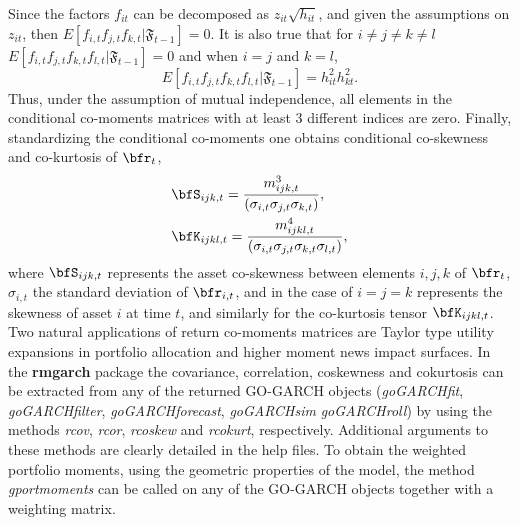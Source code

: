 Since the factors $f_{it}$ can be decomposed as $z_{it}\sqrt{h_{it}}$, and given
the assumptions on \( z_{it} \), then \(E[f_{i,t}f_{j,t}f_{k,t}|\mathfrak{F}_{t-1}] = 0\).
It is also true that for \( i \neq j\neq k \neq l \)\(E[f_{i,t}f_{j,t}f_{k,t}f_{l,t}|\mathfrak{F}_{t-1}] = 0\)
and when \(i=j\) and \(k=l\),
\begin{equation*}
E[f_{i,t}f_{j,t}f_{k,t}f_{l,t}|\mathfrak{F}_{t-1}]  =  h_{it}^2 h_{kt}^2.
\end{equation*}
Thus, under the assumption of mutual independence, all elements in the conditional
co-moments matrices with at least 3 different indices are zero. Finally, standardizing
the conditional co-moments one obtains conditional co-skewness and co-kurtosis of $\bfr_t$,
\begin{equation}\label{eq:facd7}
\begin{gathered}
  \bfS_{ijk,t} = \frac{m_{ijk,t}^3}{({\sigma_{i,t}}{\sigma _{j,t}}{\sigma _{k,t}})}, \hfill \\
  \bfK_{ijkl,t} = \frac{m_{ijkl,t}^4}{({\sigma_{i,t}}{\sigma _{j,t}}{\sigma _{k,t}}{\sigma _{l,t}})}, \hfill \\
\end{gathered}
\end{equation}
where $ \bfS_{ijk,t}$ represents the asset co-skewness between elements
$i,j,k$ of $\bfr_t$, $\sigma_{i,t}$ the standard deviation  of $\bfr_{i,t}$, and
in the case of $i=j=k$ represents the skewness of asset \(i\) at time $t$, and
similarly for the co-kurtosis tensor $\bfK_{ijkl,t}$. Two natural applications
of return co-moments matrices are Taylor type utility expansions in portfolio
allocation and higher moment news impact surfaces. In the {\bf rmgarch} package
the covariance, correlation, coskewness and cokurtosis can be extracted from any
of the returned GO-GARCH objects (\emph{goGARCHfit}, \emph{goGARCHfilter},
\emph{goGARCHforecast}, \emph{goGARCHsim} \emph{goGARCHroll}) by using the methods
\emph{rcov}, \emph{rcor}, \emph{rcoskew} and \emph{rcokurt}, respectively.
Additional arguments to these methods are clearly detailed in the help files.
To obtain the weighted portfolio moments, using the geometric properties of the
model, the method \emph{gportmoments} can be called on any of the GO-GARCH
objects together with a weighting matrix.


